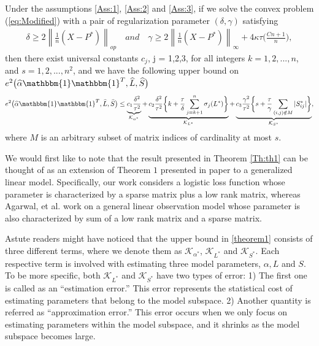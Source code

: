 \documentclass[AMS,STIX1COL]{WileyNJD-v2}
\begin{document}
{\begin{theorem} \label{Th:th1}
Under the assumptions \ref{Ass:1}, \ref{Ass:2} and \ref{Ass:3},
if we solve the convex problem (\ref{eq:Modified}) with a pair of regularization parameter $(\delta,\gamma)$ satisfying
\begin{align} \label{eq:49}
\delta \geq 2 \left\|\frac{1}{n}(X-P^{*}) \right\|_{op} \quad and \quad \gamma \geq 2\left\|\frac{1}{n}(X-P^{*})\right\|_{\infty}+4\kappa\tau\bigg(\frac{Cn+1}{n} \bigg),
\end{align}
then there exist universal constants $c_{j}$, j = 1,2,3,  for all integers $k = 1,2,...,n$, and $s = 1,2,...,n^{2}$, and we have the following upper bound on $e^{2}\big(\widehat{\alpha}\mathbbm{1}\mathbbm{1}^T,\widehat{L},\widehat{S}\big)$
\begin{align} \label{theorem1}
    e^{2}\big(\widehat{\alpha}\mathbbm{1}\mathbbm{1}^T,\widehat{L},\widehat{S}\big) \leq
    \underbrace{c_{1}\frac{\delta^{2}}{\tau^{2}}}
    _{\mathcal{K}_{\alpha^*}} +
    \underbrace{c_{2}\frac{\delta^{2}}{\tau^{2}}
    \bigg\{k + \frac{\tau}{\delta}\sum_{j=k+1}^{n}\sigma_{j}(L^{*})\bigg\}}_{\mathcal{K}_{L^*}} +
    \underbrace{c_{3}\frac{\gamma^{2}}{\tau^{2}}
    \bigg\{s + \frac{\tau}{\gamma}\sum_{(i,j) \notin M}|S^*_{ij}|\bigg\}}_{\mathcal{K}_{S^*}},
\end{align}
where $M$ is an arbitrary subset of matrix indices of cardinality at most $s$.
\end{theorem}

We would first like to note that the result presented in Theorem \ref{Th:th1} can be thought of as an extension of Theorem $1$ presented in paper \cite{agarwal2012noisy} to a generalized linear model.
Specifically, our work considers a logistic loss function whose parameter is characterized by a sparse matrix plus a low rank matrix,
whereas Agarwal, et al. \cite{agarwal2012noisy} work on a general linear observation model whose parameter is also
characterized by sum of a low rank matrix and a sparse matrix.


Astute readers might have noticed that the upper bound in \eqref{theorem1} consists of three different terms, where we denote them as
$\mathcal{K}_{\alpha^*}$, $\mathcal{K}_{L^*}$ and $\mathcal{K}_{S^*}$.
Each respective term is involved with estimating three model parameters, $\alpha, L$ and $S$.
To be more specific, both $\mathcal{K}_{L^*}$ and $\mathcal{K}_{S^*}$ have two types of error:
1) The first one is called as an ``estimation error.''
This error represents the statistical cost of estimating parameters that belong to the model subspace.
2) Another quantity is referred as ``approximation error.''
This error occurs when we only focus on estimating parameters within the model subspace,
and it shrinks as the model subspace becomes large.

}
\end{document}
